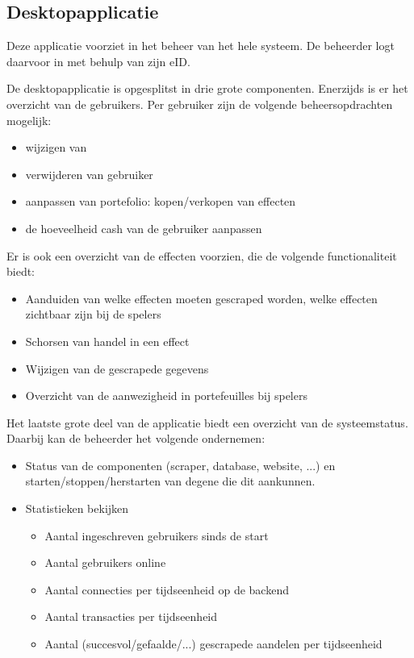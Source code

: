 \subsection{Desktopapplicatie}

Deze applicatie voorziet in het beheer van het hele systeem. De beheerder logt daarvoor in met behulp van zijn eID.

De desktopapplicatie is opgesplitst in drie grote componenten.
Enerzijds is er het overzicht van de gebruikers. Per gebruiker zijn de volgende beheersopdrachten mogelijk: 
\begin{itemize}
\item{wijzigen van}
\item{verwijderen van gebruiker}
\item{aanpassen van portefolio: kopen/verkopen van effecten}
\item{de hoeveelheid cash van de gebruiker aanpassen}
\end{itemize}

Er is ook een overzicht van de effecten voorzien, die de volgende functionaliteit biedt:
\begin{itemize}
\item{Aanduiden van welke effecten moeten gescraped worden, welke effecten zichtbaar zijn bij de spelers}
\item{Schorsen van handel in een effect}
\item{Wijzigen van de gescrapede gegevens}
\item{Overzicht van de aanwezigheid in portefeuilles bij spelers}
\end{itemize}

Het laatste grote deel van de applicatie biedt een overzicht van de systeemstatus. Daarbij kan de beheerder het volgende ondernemen:
\begin{itemize}
\item{Status van de componenten (scraper, database, website, ...) en starten/stoppen/herstarten van degene die dit aankunnen.}
\item{Statistieken bekijken}
	\begin{itemize}
	\item{Aantal ingeschreven gebruikers sinds de start}
	\item{Aantal gebruikers online}
	\item{Aantal connecties per tijdseenheid op de backend}
	\item{Aantal transacties per tijdseenheid}
	\item{Aantal (succesvol/gefaalde/...) gescrapede aandelen per tijdseenheid}
	\end{itemize}
\end{itemize}

